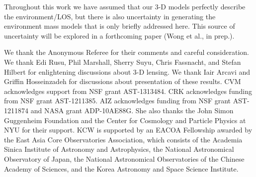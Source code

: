 \documentclass{emulateapj}
\begin{document}
Throughout this work we have assumed that our 3-D models perfectly describe the environment/LOS, but there is also uncertainty in generating the environment mass models that is only briefly addressed here. This source of uncertainty will be explored in a forthcoming paper (Wong et al., in prep.).

\acknowledgements
We thank the Anonymous Referee for their comments and careful consideration. We thank Edi Rusu, Phil Marshall, Sherry Suyu, Chris Fassnacht, and Stefan Hilbert for enlightening discussions about 3-D lensing. We thank Iair Arcavi and Griffin Hosseinzadeh for discussions about presentation of these results. CVM acknowledges support from NSF grant AST-1313484. CRK acknowledges funding from NSF grant AST-1211385. AIZ acknowledges funding from NSF grant AST-1211874 and NASA grant ADP-10AE88G. She also thanks the John Simon Guggenheim Foundation and the Center for Cosmology and Particle Physics at NYU for their support. KCW is supported by an EACOA Fellowship awarded by the East Asia Core Observatories Association, which consists of the Academia Sinica Institute of Astronomy and Astrophysics, the National Astronomical Observatory of Japan, the National Astronomical Observatories of the Chinese Academy of Sciences, and the Korea Astronomy and Space Science Institute.


%


\end{document}
